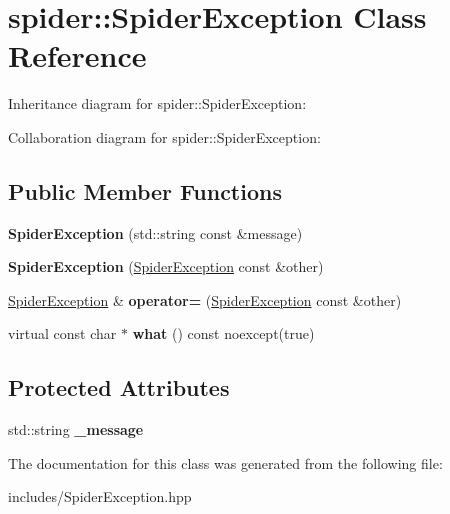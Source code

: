 \hypertarget{classspider_1_1_spider_exception}{}\section{spider\+:\+:Spider\+Exception Class Reference}
\label{classspider_1_1_spider_exception}


Inheritance diagram for spider\+:\+:Spider\+Exception\+:


Collaboration diagram for spider\+:\+:Spider\+Exception\+:
\subsection*{Public Member Functions}
\begin{DoxyCompactItemize}
\item 
\mbox{\label{classspider_1_1_spider_exception_ac1d9b09c46f784c65af0ccfa5a121836}} 
{\bfseries Spider\+Exception} (std\+::string const \&message)
\item 
\mbox{\label{classspider_1_1_spider_exception_a1c0be87484f4e6cf69be2c14c35435d2}} 
{\bfseries Spider\+Exception} (\hyperlink{classspider_1_1_spider_exception}{Spider\+Exception} const \&other)
\item 
\mbox{\label{classspider_1_1_spider_exception_ad4449683f11bf69300aefd3b0348bc0c}} 
\hyperlink{classspider_1_1_spider_exception}{Spider\+Exception} \& {\bfseries operator=} (\hyperlink{classspider_1_1_spider_exception}{Spider\+Exception} const \&other)
\item 
\mbox{\label{classspider_1_1_spider_exception_a83966aeb6494231a91bca0b6fa2863e9}} 
virtual const char $\ast$ {\bfseries what} () const noexcept(true)
\end{DoxyCompactItemize}
\subsection*{Protected Attributes}
\begin{DoxyCompactItemize}
\item 
\mbox{\label{classspider_1_1_spider_exception_aa0f728154d091f67989b3ac84651c158}} 
std\+::string {\bfseries \+\_\+message}
\end{DoxyCompactItemize}


The documentation for this class was generated from the following file\+:\begin{DoxyCompactItemize}
\item 
includes/Spider\+Exception.\+hpp\end{DoxyCompactItemize}
